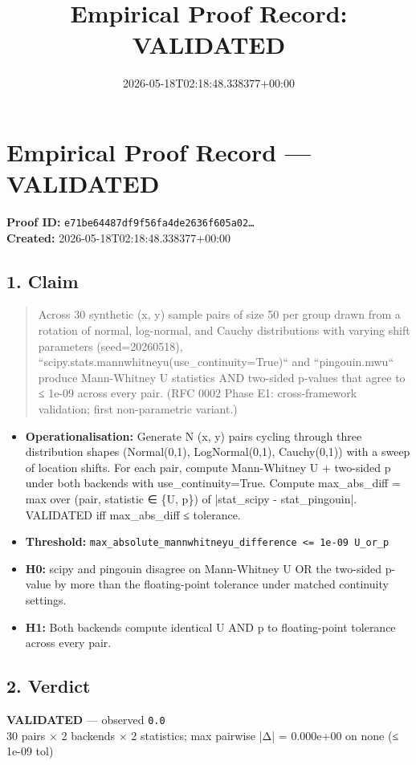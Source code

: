 \documentclass{article}
\title{Empirical Proof Record: VALIDATED}
\date{2026-05-18T02:18:48.338377+00:00}
\begin{document}
\maketitle
\section*{Empirical Proof Record --- \textcolor{validated}{\textbf{VALIDATED}}}
\textbf{Proof ID:} \texttt{e71be64487df9f56fa4de2636f605a02\dots}\\
\textbf{Created:} 2026-05-18T02:18:48.338377+00:00
\subsection*{1. Claim}
\begin{quote}Across 30 synthetic (x, y) sample pairs of size 50 per group drawn from a rotation of normal, log-normal, and Cauchy distributions with varying shift parameters (seed=20260518), ``scipy.stats.mannwhitneyu(use\_continuity=True)`` and ``pingouin.mwu`` produce Mann-Whitney U statistics AND two-sided p-values that agree to ≤ 1e-09 across every pair. (RFC 0002 Phase E1: cross-framework validation; first non-parametric variant.)\end{quote}
\begin{itemize}
\item \textbf{Operationalisation:} Generate N (x, y) pairs cycling through three distribution shapes (Normal(0,1), LogNormal(0,1), Cauchy(0,1)) with a sweep of location shifts. For each pair, compute Mann-Whitney U + two-sided p under both backends with use\_continuity=True. Compute max\_abs\_diff = max over (pair, statistic ∈ \{U, p\}) of |stat\_scipy - stat\_pingouin|. VALIDATED iff max\_abs\_diff ≤ tolerance.
\item \textbf{Threshold:} \texttt{max\_absolute\_mannwhitneyu\_difference <= 1e-09 U\_or\_p}
\item \textbf{H0:} scipy and pingouin disagree on Mann-Whitney U OR the two-sided p-value by more than the floating-point tolerance under matched continuity settings.
\item \textbf{H1:} Both backends compute identical U AND p to floating-point tolerance across every pair.
\end{itemize}
\subsection*{2. Verdict}
\textcolor{validated}{\textbf{VALIDATED}} --- observed \texttt{0.0}\\
30 pairs × 2 backends × 2 statistics; max pairwise |Δ| = 0.000e+00 on none (≤ 1e-09 tol)
\end{document}
